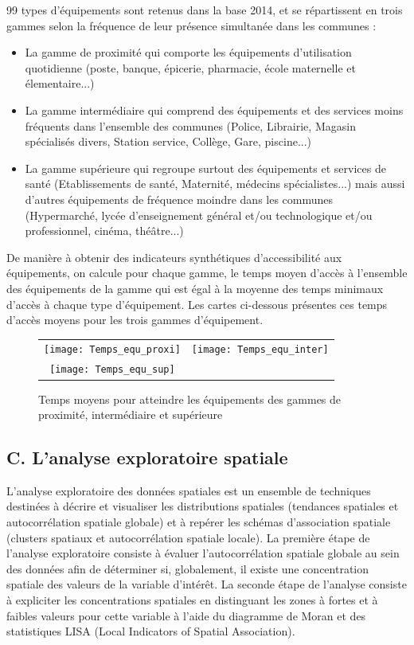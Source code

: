 \documentclass[10.5pt,a4paper]{article}
\begin{document}
{99 types d'équipements sont retenus dans la base 2014, et se répartissent en trois gammes selon la fréquence de leur présence simultanée dans les communes : \par

\begin{itemize}[font=\tiny]
	\item La gamme de proximité qui comporte les équipements d'utilisation quotidienne (poste, banque, épicerie, pharmacie, école maternelle et élementaire...)
	\item La gamme intermédiaire qui comprend des équipements et des services moins fréquents dans l'ensemble des communes (Police, Librairie, Magasin spécialisés divers, Station service, Collège, Gare, piscine...)
	\item La gamme supérieure qui regroupe surtout des équipements et services de santé (Etablissements de santé, Maternité, médecins spécialistes...) mais aussi d'autres équipements de fréquence moindre dans les communes (Hypermarché, lycée d'enseignement général et/ou technologique et/ou professionnel, cinéma, théâtre...)
\end{itemize}

De manière à obtenir des indicateurs synthétiques d'accessibilité aux équipements, on calcule pour chaque gamme, le temps moyen d'accès à l'ensemble des équipements de la gamme qui est égal à la moyenne des temps minimaux d'accès à chaque type d'équipement. Les cartes ci-dessous présentes ces temps d'accès moyens pour les trois gammes d'équipement.  \par

\begin{figure}[h!]%
\label{Temps_equ}%
\caption{Temps moyens pour atteindre les équipements des gammes de proximité, intermédiaire et supérieure}
\begin{tabular}{cc}
\texttt{[image: Temps\_equ\_proxi]}  & \texttt{[image: Temps\_equ\_inter]} \\
\texttt{[image: Temps\_equ\_sup]}
\end{tabular}
\end{figure}

\newpage

\subsection{C. L'analyse exploratoire spatiale}\label{ann:anaspa}

L'analyse exploratoire des données spatiales est un ensemble de techniques destinées à décrire et
visualiser les distributions spatiales (tendances spatiales et autocorrélation spatiale globale) et
à repérer les schémas d'association spatiale (clusters spatiaux et autocorrélation spatiale locale).
La première étape de l'analyse exploratoire consiste à évaluer l'autocorrélation spatiale globale au
sein des données afin de déterminer si, globalement, il existe une concentration spatiale des valeurs de la variable d'intérêt. 
La seconde étape de l'analyse consiste à expliciter les concentrations spatiales en distinguant les zones à fortes et à faibles valeurs pour cette variable à l'aide du diagramme de Moran et des statistiques LISA (Local Indicators of Spatial Association).\par

}
\end{document}
